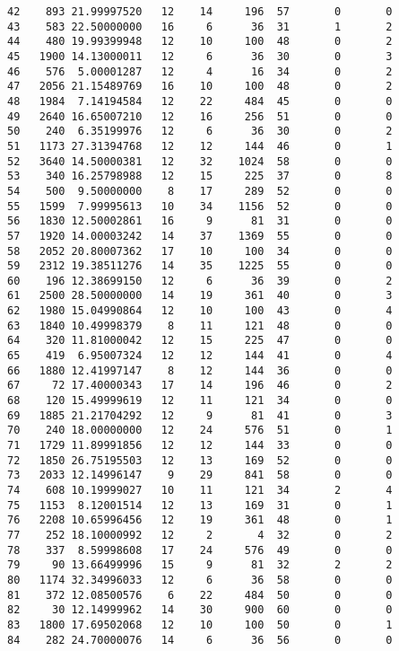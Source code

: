 \documentclass[
  letterpaper,
  DIV=11,
  numbers=noendperiod]{scrreprt}
\begin{document}
\begin{verbatim}
42    893 21.99997520   12    14     196  57       0       0
43    583 22.50000000   16     6      36  31       1       2
44    480 19.99399948   12    10     100  48       0       2
45   1900 14.13000011   12     6      36  30       0       3
46    576  5.00001287   12     4      16  34       0       2
47   2056 21.15489769   16    10     100  48       0       2
48   1984  7.14194584   12    22     484  45       0       0
49   2640 16.65007210   12    16     256  51       0       0
50    240  6.35199976   12     6      36  30       0       2
51   1173 27.31394768   12    12     144  46       0       1
52   3640 14.50000381   12    32    1024  58       0       0
53    340 16.25798988   12    15     225  37       0       8
54    500  9.50000000    8    17     289  52       0       0
55   1599  7.99995613   10    34    1156  52       0       0
56   1830 12.50002861   16     9      81  31       0       0
57   1920 14.00003242   14    37    1369  55       0       0
58   2052 20.80007362   17    10     100  34       0       0
59   2312 19.38511276   14    35    1225  55       0       0
60    196 12.38699150   12     6      36  39       0       2
61   2500 28.50000000   14    19     361  40       0       3
62   1980 15.04990864   12    10     100  43       0       4
63   1840 10.49998379    8    11     121  48       0       0
64    320 11.81000042   12    15     225  47       0       0
65    419  6.95007324   12    12     144  41       0       4
66   1880 12.41997147    8    12     144  36       0       0
67     72 17.40000343   17    14     196  46       0       2
68    120 15.49999619   12    11     121  34       0       0
69   1885 21.21704292   12     9      81  41       0       3
70    240 18.00000000   12    24     576  51       0       1
71   1729 11.89991856   12    12     144  33       0       0
72   1850 26.75195503   12    13     169  52       0       0
73   2033 12.14996147    9    29     841  58       0       0
74    608 10.19999027   10    11     121  34       2       4
75   1153  8.12001514   12    13     169  31       0       1
76   2208 10.65996456   12    19     361  48       0       1
77    252 18.10000992   12     2       4  32       0       2
78    337  8.59998608   17    24     576  49       0       0
79     90 13.66499996   15     9      81  32       2       2
80   1174 32.34996033   12     6      36  58       0       0
81    372 12.08500576    6    22     484  50       0       0
82     30 12.14999962   14    30     900  60       0       0
83   1800 17.69502068   12    10     100  50       0       1
84    282 24.70000076   14     6      36  56       0       0

\end{verbatim}
\end{document}
